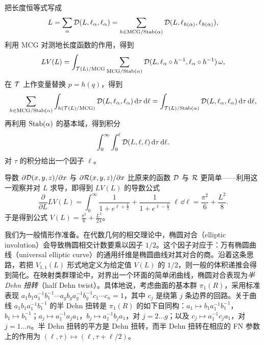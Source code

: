
把长度恒等式写成
\[
L=\sum_{\alpha}\mathcal{D}(L,\ell_\alpha,\ell_\alpha)=\sum_{h\in\mathrm{MCG}/\mathrm{Stab}(\alpha)}\mathcal{D}(L,\ell_{h(\alpha)},\ell_{h(\alpha)}),
\]
利用 MCG 对测地长度函数的作用，得到
\[
LV(L)=\int_{\mathcal{T}(L)/\mathrm{MCG}}\sum_{\mathrm{MCG}/\mathrm{Stab}(\alpha)}\mathcal{D}(L,\ell_\alpha\circ h^{-1},\ell_\alpha\circ h^{-1})\,\omega,
\]
在 $\mathcal{T}$ 上作变量替换 $p=h(q)$，得到
\[
\sum_{h\in\mathrm{MCG}/\mathrm{Stab}(\alpha)}\int_{h(\mathcal{T}(L)/\mathrm{MCG})}\mathcal{D}(L,\ell_\alpha,\ell_\alpha)\,\mathrm{d}\tau\,\mathrm{d}\ell
=\int_{\mathcal{T}(L)/\mathrm{Stab}(\alpha)}\mathcal{D}(L,\ell_\alpha,\ell_\alpha)\,\mathrm{d}\tau\,\mathrm{d}\ell,
\]
再利用 $\mathrm{Stab}(\alpha)$ 的基本域，得到积分
\[
\int_0^\infty\int_0^\ell\mathcal{D}(L,\ell,\ell)\,\mathrm{d}\tau\,\mathrm{d}\ell.
\]
对 $\tau$ 的积分给出一个因子 $\ell$。

导数 $\partial\mathcal{D}(x,y,z)/\partial x$ 与 $\partial\mathcal{R}(x,y,z)/\partial x$ 比原来的函数 $\mathcal{D}$ 与 $\mathcal{R}$ 更简单——利用这一观察并对 $L$ 求导，即得到 $LV(L)$ 的导数公式
\[
\frac{\partial}{\partial L}LV(L)=\int_0^\infty\frac{1}{1+e^{\ell+\frac{L}{2}}}
+\frac{1}{1+e^{\ell-\frac{L}{2}}}\;\ell\,\dd\ell=\frac{\pi^2}{6}+\frac{L^2}{8}.
\]
于是得到公式 $V(L)=\frac{\pi^2}{6}+\frac{L^2}{24}$。


我们为一般情形作准备。在代数几何的相交理论中，椭圆对合（elliptic involution）会导致椭圆相交计数要乘以因子 $1/2$。这个因子对应于：万有椭圆曲线（universal elliptic curve）的通用纤维是椭圆曲线对其对合的商。沿着这条思路，若把 $V_{1,1}(L)$ 形式地定义为给定值 $V(L)$ 的 $1/2$，则一般的体积递推会得到简化。在映射类群理论中，对界出一个环面的简单闭曲线，椭圆对合表现为\emph{半 Dehn 扭转}（half Dehn twist）。具体地说，考虑曲面的基本群 $\pi_1(R)$，采用标准表现 $a_1b_1a_1^{-1}b_1^{-1}\cdots a_gb_ga_g^{-1}b_g^{-1}c_1\cdots c_n=1$，其中 $c_j$ 是绕第 $j$ 条边界的回路。关于曲线 $a_1b_1a_1^{-1}b_1^{-1}$ 的半 Dehn 扭转是 $\pi_1(R)$ 的如下自同构：$a_1\mapsto b_1a_1^{-1}b_1^{-1}$，$b_1\mapsto b_1^{-1}$；$a_j\mapsto a_1^{-1}a_ja_1$，$b_j\mapsto a_1^{-1}b_ja_1$，对 $j=2\ldots g$；以及 $c_j\mapsto a_1^{-1}c_ja_1$，对 $j=1\ldots n$。半 Dehn 扭转的平方是 Dehn 扭转，而半 Dehn 扭转在相应的 FN 参数上的作用为 $(\ell,\tau)\mapsto(\ell,\tau+\ell/2)$。

